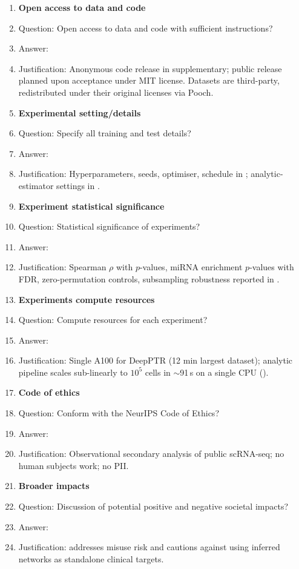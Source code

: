 \begin{enumerate}
\item {\bf Open access to data and code}
  \item[] Question: Open access to data and code with sufficient instructions?
  \item[] Answer: \answerYes{}
  \item[] Justification: Anonymous code release in supplementary; public
  release planned upon acceptance under MIT license. Datasets are
  third-party, redistributed under their original licenses via Pooch.

\item {\bf Experimental setting/details}
  \item[] Question: Specify all training and test details?
  \item[] Answer: \answerYes{}
  \item[] Justification: Hyperparameters, seeds, optimiser, schedule in
  ; analytic-estimator settings in .

\item {\bf Experiment statistical significance}
  \item[] Question: Statistical significance of experiments?
  \item[] Answer: \answerYes{}
  \item[] Justification: Spearman $\rho$ with $p$-values, miRNA enrichment
  $p$-values with FDR, zero-permutation controls, subsampling robustness
  reported in .

\item {\bf Experiments compute resources}
  \item[] Question: Compute resources for each experiment?
  \item[] Answer: \answerYes{}
  \item[] Justification: Single A100 for DeepPTR (12 min largest dataset);
  analytic pipeline scales sub-linearly to $10^5$ cells in $\sim$91\,s on a
  single CPU ().

\item {\bf Code of ethics}
  \item[] Question: Conform with the NeurIPS Code of Ethics?
  \item[] Answer: \answerYes{}
  \item[] Justification: Observational secondary analysis of public scRNA-seq;
  no human subjects work; no PII.

\item {\bf Broader impacts}
  \item[] Question: Discussion of potential positive and negative societal
  impacts?
  \item[] Answer: \answerYes{}
  \item[] Justification:  addresses misuse risk and
  cautions against using inferred networks as standalone clinical targets.


\end{enumerate}
